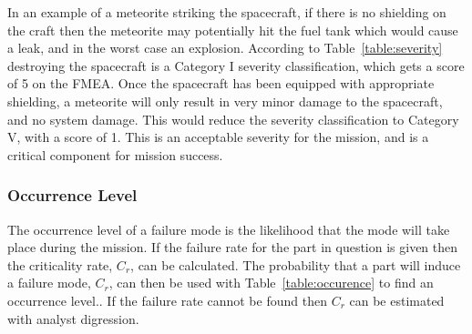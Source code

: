 \documentclass[paper=letter, fontsize=11pt]{scrartcl} %
\numberwithin{equation}{section} %
\numberwithin{figure}{section} %
\numberwithin{table}{section} %
\begin{document}
In an example of a meteorite striking the spacecraft, if there is no shielding on the craft then the meteorite may potentially hit the fuel tank which would cause a leak, and in the worst case an explosion. According to Table~\ref{table:severity} destroying the spacecraft is a Category I severity classification, which gets a score of 5 on the FMEA. Once the spacecraft has been equipped with appropriate shielding, a meteorite will only result in very minor damage to the spacecraft, and no system damage. This would reduce the severity classification to Category V, with a score of 1. This is an acceptable severity for the mission, and is a critical component for mission success.

\subsubsection{Occurrence Level}
The occurrence level of a failure mode is the likelihood that the mode will take place during the mission. If the failure rate for the part in question is given then the criticality rate, $C_r$, can be calculated. The probability that a part will induce a failure mode, $C_r$, can then be used with Table~\ref{table:occurence} to find an occurrence level.. If the failure rate cannot be found then $C_r$ can be estimated with analyst digression.
\end{document}
